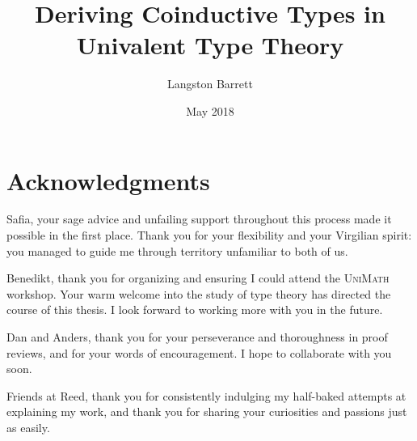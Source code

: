 \documentclass[12pt,twoside]{reedthesis}
\title{Deriving Coinductive Types in Univalent Type Theory}
\author{Langston Barrett}
\date{May 2018}
\let\oldindex\index
\renewcommand{\index}[1]
               {\oldindex{#1}\marginpar{\footnotesize\color{index}index: #1}}
\newcommand{\indeX}{\oldindex}
\newcommand{\indeX}{\index}
\newcommand{\software}[1]{{\textsc{#1}}\indeX{#1}}
\newcommand{\UniMath}{\software{UniMath}}
\begin{document}
\maketitle
\frontmatter %
\pagestyle{empty} %


\chapter*{Acknowledgments}

\noindent Safia, your sage advice and unfailing support throughout this
process made it possible in the first place. Thank you for your flexibility and
your Virgilian spirit: you managed to guide me through territory unfamiliar to
both of us.

\vspace{0.6em}

\noindent Benedikt, thank you for organizing and ensuring I could attend
the \UniMath{} workshop. Your warm welcome into the study of type theory
has directed the course of this thesis. I look forward to working more with
you in the future.

\vspace{0.6em}

\noindent Dan and Anders, thank you for your perseverance and thoroughness in
proof reviews, and for your words of encouragement. I hope to collaborate
with you soon.

\vspace{0.6em}

\noindent Friends at Reed, thank you for consistently indulging my half-baked
attempts at explaining my work, and thank you for sharing your curiosities and
passions just as easily.


\end{document}
